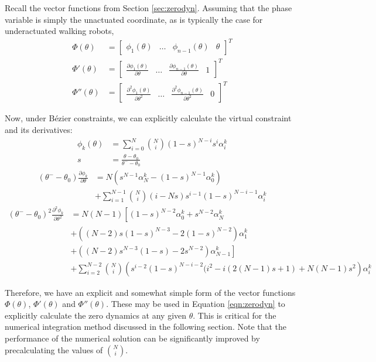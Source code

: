 Recall the vector functions from Section \ref{sec:zerodyn}. Assuming that the phase variable is simply the unactuated coordinate, as is typically the case for underactuated walking robots,
\begin{align*}
	\Phi\left(\theta\right) &= 
	\begin{bmatrix}
	\phi_1\left(\theta\right) & \ldots & \phi_{n-1}\left(\theta\right) & \theta
	\end{bmatrix}^T \\
	\Phi'\left(\theta\right) &=
	\begin{bmatrix}
	\frac{\partial\phi_1\left(\theta\right)}{\partial\theta} & \ldots & \frac{\partial\phi_{n-1}\left(\theta\right)}{\partial\theta} & 1 
	\end{bmatrix}^T \\
	\Phi''\left(\theta\right) &=
	\begin{bmatrix}
	\frac{\partial^2\phi_1\left(\theta\right)}{\partial\theta^2} & \ldots & \frac{\partial^2\phi_{n-1}\left(\theta\right)}{\partial\theta^2} & 0 
	\end{bmatrix}^T
\end{align*}

Now, under Bézier constraints, we can explicitly calculate the virtual constraint and its derivatives:
\begin{subequations}
\begin{align}
	\phi_k\left(\theta\right) &= \sum_{i=0}^{N}\binom{N}{i}
	(1-s)^{N-i} s^i\alpha_i^k \\
	s &= \frac{\theta - \theta_0}{\theta^- - \theta_0}
\end{align}
\end{subequations}
\begin{align}
	(\theta^--\theta_0)\frac{\partial\phi_k}{\partial\theta} &=
	N\left( s^{N-1}\alpha^k_N - (1-s)^{N-1}\alpha^k_0 \right) \\ \nonumber
	&+ \sum_{i=1}^{N-1} \binom{N}{i} (i-Ns)s^{i-1}(1-s)^{N-i-1}\alpha^k_i
\end{align}
\begin{align}
	(\theta^--\theta_0)^2\frac{\partial^2\phi_k}{\partial\theta^2} &= 
	N(N-1)\left[ (1-s)^{N-2}\alpha^k_0 + s^{N-2}\alpha^k_N \right.\\
		&+ ((N-2)s(1-s)^{N-3} - 2(1-s)^{N-2})\alpha^k_1 \nonumber \\
		&+ \left. ((N-2)s^{N-3}(1-s) - 2s^{N-2})\alpha^k_{N-1}	\right] \nonumber \\
	&+ \sum_{i=2}^{N-2} \binom{N}{i} 
		\left(s^{i-2}(1-s)^{N-i-2}(i^2-i(2(N-1)s + 1) + N(N-1)s^2 \right) \alpha^k_i \nonumber
\end{align}

Therefore, we have an explicit and somewhat simple form of the vector functions $\Phi\left(\theta\right)$, $\Phi'\left(\theta\right)$ and $\Phi''\left(\theta\right)$. These may be used in Equation \ref{eqn:zerodyn} to explicitly calculate the zero dynamics at any given $\theta$. This is critical for the numerical integration method discussed in the following section. Note that the performance of the numerical solution can be significantly improved by precalculating the values of $\binom{N}{i}$.